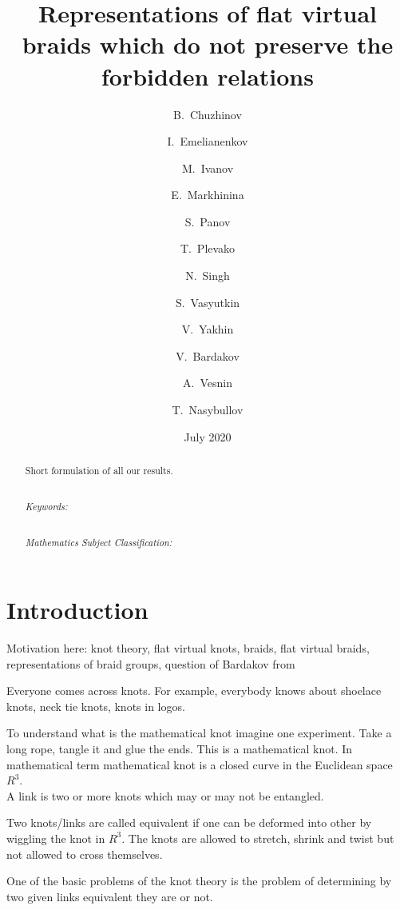 \documentclass{article}
\title{Representations of flat virtual braids which do not preserve the forbidden relations}
\author{B.~Chuzhinov \and I.~Emelianenkov \and  M.~Ivanov \and E.~Markhinina  \and S.~Panov \and  T.~Plevako \and N.~Singh \and S.~Vasyutkin \and V.~Yakhin \and V.~Bardakov \and A.~Vesnin \and T.~Nasybullov}
\date{July 2020}
\begin{document}
\maketitle

\begin{abstract}

 Short formulation of all our results.

 

 

 ~\\

 \textit{Keywords:}

 

 ~\\

 \textit{Mathematics Subject Classification:} 

\end{abstract}



\section{Introduction}

Motivation here: knot theory, flat virtual knots, braids, flat virtual braids, representations of braid groups, question of Bardakov from \cite{problems}



Everyone comes across knots. For example, everybody knows about shoelace knots, neck tie knots, knots in logos. 



To understand what is the mathematical knot imagine one experiment. Take a long rope, tangle it and glue the ends. This is a mathematical knot. In mathematical term mathematical knot is  a closed curve in the Euclidean space $R^3$. \\



A link is two or more knots which may or may not be entangled.



Two knots/links are called equivalent if one can be deformed into other by wiggling the knot in $R^3$. The knots are allowed to stretch, shrink and twist but not allowed to cross themselves.



One of the basic problems of the knot theory is the problem of determining by two given links equivalent they are or not.\\
\end{document}
